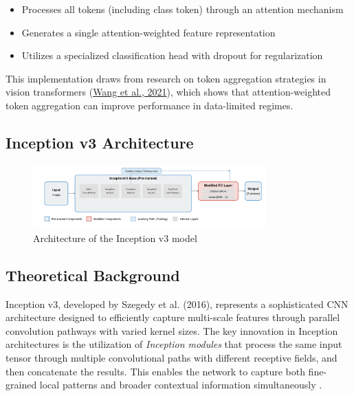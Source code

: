 \documentclass[a4paper,12pt]{report}
\begin{document}
\begin{itemize}
    \item Processes all tokens (including class token) through an attention mechanism
    \item Generates a single attention-weighted feature representation
    \item Utilizes a specialized classification head with dropout for regularization
\end{itemize}

This implementation draws from research on token aggregation strategies in vision transformers (\href{https://arxiv.org/abs/2012.09688}{Wang et al., 2021}), which shows that attention-weighted token aggregation can improve performance in data-limited regimes.

\subsection{Inception v3 Architecture}

\begin{figure}[h]
    \centering
    \includegraphics[width=0.8\textwidth]{images/architecture/inception.png}
    \caption{Architecture of the Inception v3 model}
    \label{fig:inception_architecture}
\end{figure}

\subsection*{Theoretical Background}

Inception v3, developed by Szegedy et al. (2016), represents a sophisticated CNN architecture designed to efficiently capture multi-scale features through parallel convolution pathways with varied kernel sizes. The key innovation in Inception architectures is the utilization of \textit{Inception modules} that process the same input tensor through multiple convolutional paths with different receptive fields, and then concatenate the results. This enables the network to capture both fine-grained local patterns and broader contextual information simultaneously \citep{szegedy2015rethinkinginceptionarchitecturecomputer}.
\end{document}
